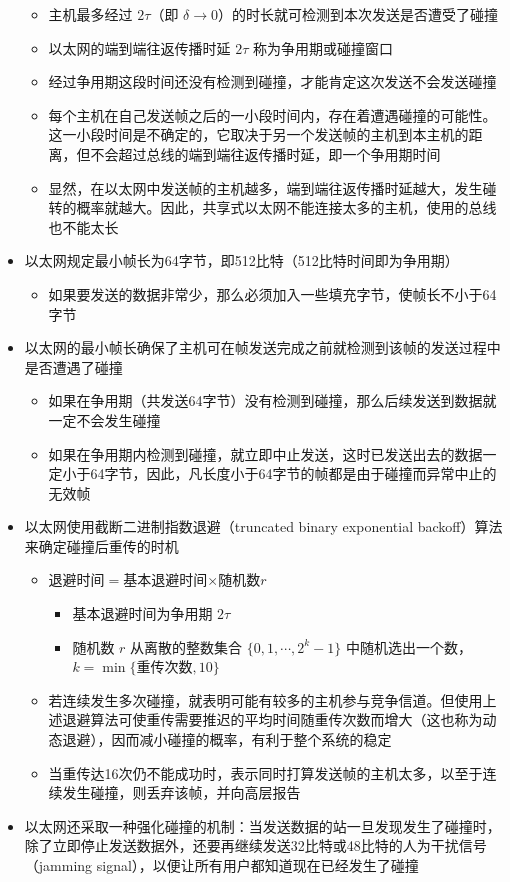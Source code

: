 \documentclass[cs4size,a4paper,10pt]{ctexart}
\begin{document}
\begin{itemize}
\begin{figure}[H]
		\end{figure}
		\begin{itemize}
			\item 主机最多经过 $2\tau$（即 $\delta\to 0$）的时长就可检测到本次发送是否遭受了碰撞
			\item 以太网的端到端往返传播时延 $2\tau$ 称为争用期或碰撞窗口
			\item 经过争用期这段时间还没有检测到碰撞，才能肯定这次发送不会发送碰撞
			\item 每个主机在自己发送帧之后的一小段时间内，存在着遭遇碰撞的可能性。这一小段时间是不确定的，它取决于另一个发送帧的主机到本主机的距离，但不会超过总线的端到端往返传播时延，即一个争用期时间
			\item 显然，在以太网中发送帧的主机越多，端到端往返传播时延越大，发生碰转的概率就越大。因此，共享式以太网不能连接太多的主机，使用的总线也不能太长
		\end{itemize}
		\item 以太网规定最小帧长为64字节，即512比特（512比特时间即为争用期）
		\begin{itemize}
			\item 如果要发送的数据非常少，那么必须加入一些填充字节，使帧长不小于64字节
		\end{itemize}
		\item 以太网的最小帧长确保了主机可在帧发送完成之前就检测到该帧的发送过程中是否遭遇了碰撞
		\begin{itemize}
			\item 如果在争用期（共发送64字节）没有检测到碰撞，那么后续发送到数据就一定不会发生碰撞
			\item 如果在争用期内检测到碰撞，就立即中止发送，这时已发送出去的数据一定小于64字节，因此，凡长度小于64字节的帧都是由于碰撞而异常中止的无效帧
		\end{itemize}
		\item 以太网使用截断二进制指数退避（truncated binary exponential backoff）算法来确定碰撞后重传的时机
		\begin{itemize}
			\item 退避时间$=$基本退避时间$\times$随机数$r$
			\begin{itemize}
				\item 基本退避时间为争用期 $2\tau$
				\item 随机数 $r$ 从离散的整数集合 $\{0,1,\cdots,2^k-1\}$ 中随机选出一个数， $k=\min\{\mbox{重传次数},10\}$
			\end{itemize}
			\item 若连续发生多次碰撞，就表明可能有较多的主机参与竞争信道。但使用上述退避算法可使重传需要推迟的平均时间随重传次数而增大（这也称为动态退避），因而减小碰撞的概率，有利于整个系统的稳定
			\item 当重传达16次仍不能成功时，表示同时打算发送帧的主机太多，以至于连续发生碰撞，则丢弃该帧，并向高层报告
		\end{itemize}
		\item 以太网还采取一种强化碰撞的机制：当发送数据的站一旦发现发生了碰撞时，除了立即停止发送数据外，还要再继续发送32比特或48比特的人为干扰信号（jamming signal），以便让所有用户都知道现在已经发生了碰撞
	\end{itemize}
\end{document}
